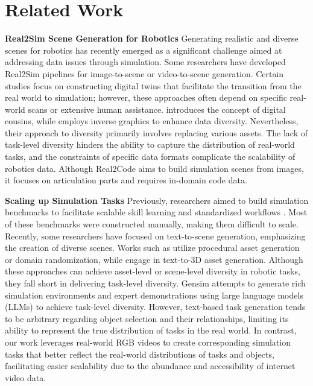 \section{Related Work}

\textbf{Real2Sim Scene Generation for Robotics} 
Generating realistic and diverse scenes for robotics has recently emerged as a significant challenge aimed at addressing data issues through simulation. Some researchers have developed Real2Sim pipelines for image-to-scene or video-to-scene generation. Certain studies \citep{hsu2023ditto, torne2024reconciling} focus on constructing digital twins that facilitate the transition from the real world to simulation; however, these approaches often depend on specific real-world scans or extensive human assistance. \cite{daiacdc} introduces the concept of digital cousins, while \cite{chen2024urdformer} employs inverse graphics to enhance data diversity. Nevertheless, their approach to diversity primarily involves replacing various assets.
The lack of task-level diversity hinders the ability to capture the distribution of real-world tasks, and the constraints of specific data formats complicate the scalability of robotics data. Although Real2Code \citep{mandi2024real2code} aims to build simulation scenes from images, it focuses on articulation parts and requires in-domain code data.


\textbf{Scaling up Simulation Tasks}
Previously, researchers aimed to build simulation benchmarks to facilitate scalable skill learning and standardized workflows \citep{li2023behavior, gu2023maniskill2, srivastava2022behavior, nasiriany2024robocasa}. Most of these benchmarks were constructed manually, making them difficult to scale. Recently, some researchers have focused on text-to-scene generation, emphasizing the creation of diverse scenes. Works such as \cite{deitke2022, makatura2023can, liangenvironment, chen2023genaug} utilize procedural asset generation or domain randomization, while \cite{jun2023shap, yu2023scaling, poole2022dreamfusion} engage in text-to-3D asset generation. Although these approaches can achieve asset-level or scene-level diversity in robotic tasks, they fall short in delivering task-level diversity.
Gensim \citep{wang2023gensim} attempts to generate rich simulation environments and expert demonstrations using large language models (LLMs) to achieve task-level diversity. However, text-based task generation tends to be arbitrary regarding object selection and their relationships, limiting its ability to represent the true distribution of tasks in the real world. In contrast, our work leverages real-world RGB videos to create corresponding simulation tasks that better reflect the real-world distributions of tasks and objects, facilitating easier scalability due to the abundance and accessibility of internet video data.


